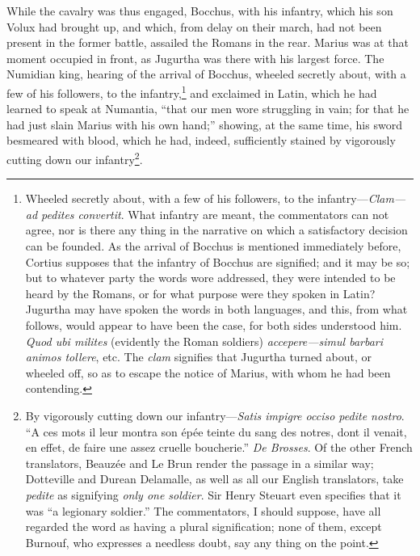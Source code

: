 While the cavalry was thus engaged, Bocchus, with his infantry, which
his son Volux had brought up, and which, from delay on their march,
had not been present in the former battle, assailed the Romans in the
rear. Marius was at that moment occupied in front, as Jugurtha was
there with his largest force. The Numidian king, hearing of the
arrival of Bocchus, wheeled secretly about, with a few of his
followers, to the infantry,\footnote{Wheeled secretly about, with a few of his followers, to the
infantry—\emph{Clam—ad pedites convertit}. What infantry are meant, the
commentators can not agree, nor is there any thing in the narrative on
which a satisfactory decision can be founded. As the arrival of
Bocchus is mentioned immediately before, Cortius supposes that the
infantry of Bocchus are signified; and it may be so; but to whatever
party the words wore addressed, they were intended to be heard by the
Romans, or for what purpose were they spoken in Latin? Jugurtha may
have spoken the words in both languages, and this, from what follows,
would appear to have been the case, for both sides understood him.
\emph{Quod ubi milites} (evidently the Roman soldiers) \emph{accepere—simul
barbari animos tollere}, etc. The \emph{clam} signifies that Jugurtha
turned about, or wheeled off, so as to escape the notice of Marius,
with whom he had been contending.} and exclaimed in Latin, which he had
learned to speak at Numantia, ``that our men wore struggling in vain;
for that he had just slain Marius with his own hand;'' showing, at the
same time, his sword besmeared with blood, which he had, indeed,
sufficiently stained by vigorously cutting down our infantry\footnote{By vigorously cutting down our infantry—\emph{Satis impigre
occiso pedite nostro}. ``A ces mots il leur montra son épée teinte du
sang des notres, dont il venait, en effet, de faire une assez cruelle
boucherie.'' \emph{De Brosses}. Of the other French translators, Beauzée and
Le Brun render the passage in a similar way; Dotteville and Durean
Delamalle, as well as all our English translators, take \emph{pedite} as
signifying \emph{only one soldier}. Sir Henry Steuart even specifies that
it was ``a legionary soldier.'' The commentators, I should suppose, have
all regarded the word as having a plural signification; none of them,
except Burnouf, who expresses a needless doubt, say any thing on the
point.}.

